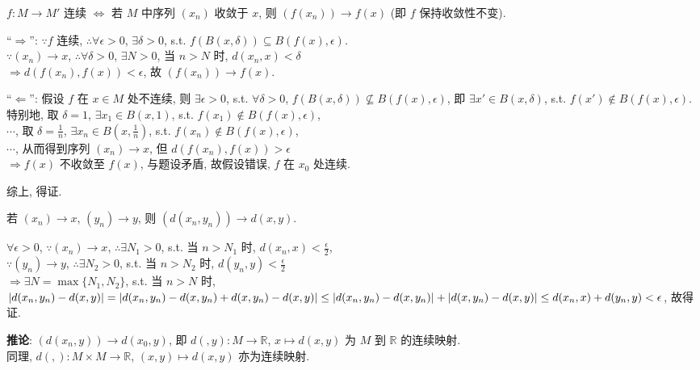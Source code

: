 \documentclass{note}
\begin{document}
\begin{thm}
    $f:M\rightarrow M'$ 连续 $\Longleftrightarrow$ 若 $M$ 中序列 $(x_n)$ 收敛于 $x$, 则 $(f(x_n))\rightarrow f(x)$ (即 $f$ 保持收敛性不变).
\end{thm}
\begin{pf}
    ``$\Longrightarrow$'': $\because f$ 连续, $\therefore\forall\epsilon>0$, $\exists\delta>0$, s.t. $f(B(x,\delta))\subseteq B(f(x),\epsilon)$.\\
    $\because(x_n)\rightarrow x$, $\therefore\forall\delta>0$, $\exists N>0$, 当 $n>N$ 时, $d(x_n,x)<\delta$\\
    $\Longrightarrow d(f(x_n),f(x))<\epsilon$, 故 $(f(x_n))\rightarrow f(x)$.

    ``$\Longleftarrow$'': 假设 $f$ 在 $x\in M$ 处不连续, 则 $\exists\epsilon>0$, s.t. $\forall\delta>0$, $f(B(x,\delta))\nsubseteq B(f(x),\epsilon)$, 即 $\exists x'\in B(x,\delta)$, s.t. $f(x')\notin B(f(x),\epsilon)$.\\
    特别地, 取 $\delta=1$, $\exists x_1\in B(x,1)$, s.t. $f(x_1)\notin B(f(x),\epsilon)$,\\
    $\cdots$, 取 $\delta=\frac{1}{n}$, $\exists x_n\in B(x,\frac{1}{n})$, s.t. $f(x_n)\notin B(f(x),\epsilon)$,\\
    $\cdots$, 从而得到序列 $(x_n)\rightarrow x$, 但 $d(f(x_n),f(x))>\epsilon$\\
    $\Longrightarrow f(x)$ 不收敛至 $f(x)$, 与题设矛盾, 故假设错误, $f$ 在 $x_0$ 处连续.

    综上, 得证.
\end{pf}

\begin{thm}[(课本定理 12.5)]
    若 $(x_n)\rightarrow x$, $(y_n)\rightarrow y$, 则 $(d(x_n,y_n))\rightarrow d(x,y)$.
\end{thm}
\begin{pf}
    $\forall\epsilon>0$, $\because(x_n)\rightarrow x$, $\therefore\exists N_1>0$, s.t. 当 $n>N_1$ 时, $d(x_n,x)<\frac{\epsilon}{2}$,\\
    $\because(y_n)\rightarrow y$, $\therefore\exists N_2>0$, s.t. 当 $n>N_2$ 时, $d(y_n,y)<\frac{\epsilon}{2}$\\
    $\Longrightarrow\exists N=\max\{N_1,N_2\}$, s.t. 当 $n>N$ 时, $\left\lvert d(x_n,y_n)-d(x,y)\right\rvert=\left\lvert d(x_n,y_n)-d(x,y_n)+d(x,y_n)-d(x,y)\right\rvert\leq\left\lvert d(x_n,y_n)-d(x,y_n)\right\rvert+\left\lvert d(x,y_n)-d(x,y)\right\rvert\leq d(x_n,x)+d(y_n,y)<\epsilon$, 故得证.
\end{pf}

\textbf{推论}: $(d(x_n,y))\rightarrow d(x_0,y)$, 即 $d(,y):M\rightarrow\mathbb{R}$, $x\mapsto d(x,y)$ 为 $M$ 到 $\mathbb{R}$ 的连续映射.\\
同理, $d(,):M\times M\rightarrow\mathbb{R}$, $(x,y)\mapsto d(x,y)$ 亦为连续映射.
\end{document}
